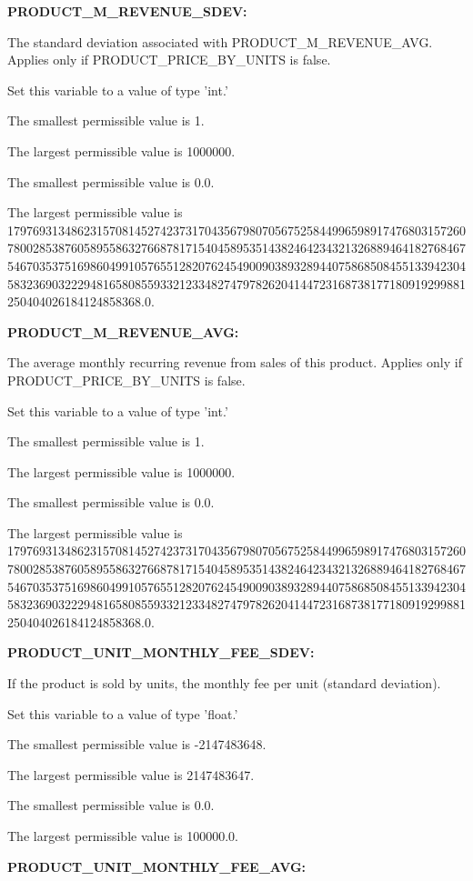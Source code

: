\textbf{PRODUCT\_M\_REVENUE\_SDEV:}


The standard deviation associated with PRODUCT\_M\_REVENUE\_AVG.  Applies only if PRODUCT\_PRICE\_BY\_UNITS is false.

Set this variable to a value of type 'int.'

The smallest permissible value is 1.

The largest permissible value is 1000000.

The smallest permissible value is 0.0.

The largest permissible value is 179769313486231570814527423731704356798070567525844996598917476803157260780028538760589558632766878171540458953514382464234321326889464182768467546703537516986049910576551282076245490090389328944075868508455133942304583236903222948165808559332123348274797826204144723168738177180919299881250404026184124858368.0.


\textbf{PRODUCT\_M\_REVENUE\_AVG:}


The average monthly recurring revenue from sales of this product.  Applies only if PRODUCT\_PRICE\_BY\_UNITS is false.

Set this variable to a value of type 'int.'

The smallest permissible value is 1.

The largest permissible value is 1000000.

The smallest permissible value is 0.0.

The largest permissible value is 179769313486231570814527423731704356798070567525844996598917476803157260780028538760589558632766878171540458953514382464234321326889464182768467546703537516986049910576551282076245490090389328944075868508455133942304583236903222948165808559332123348274797826204144723168738177180919299881250404026184124858368.0.


\textbf{PRODUCT\_UNIT\_MONTHLY\_FEE\_SDEV:}


If the product is sold by units, the monthly fee per unit (standard deviation).

Set this variable to a value of type 'float.'

The smallest permissible value is -2147483648.

The largest permissible value is 2147483647.

The smallest permissible value is 0.0.

The largest permissible value is 100000.0.


\textbf{PRODUCT\_UNIT\_MONTHLY\_FEE\_AVG:}


